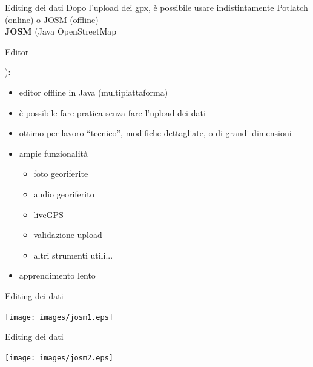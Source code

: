 \documentclass[slidestop,compress,red,notes,xcolor=dvipsnames]{beamer}	%
\begin{document}
        \begin{frame}{Editing dei dati}
            Dopo l'upload dei gpx, è possibile usare indistintamente Potlatch (online) o JOSM (offline)\pause\\
            \vspace{0.4cm}
            \textbf{JOSM} (Java OpenStreetMap \begin{footnotesize}Editor\end{footnotesize}):
            \begin{itemize}
                \item editor offline in Java (multipiattaforma)
                \pause
                \item è possibile fare pratica senza fare l'upload dei dati
                \pause
                \item ottimo per lavoro ``tecnico'', modifiche dettagliate, o di grandi dimensioni
                \pause
                \item ampie funzionalità
                \begin{itemize}
                    \item foto georiferite
                    \item audio georiferito
                    \item liveGPS
                    \item validazione upload
                    \item altri strumenti utili...
                \end{itemize}
                \pause
                \item apprendimento lento
            \end{itemize}
        \end{frame}

        \begin{frame}{Editing dei dati}
            \begin{center}
                \texttt{[image: images/josm1.eps]}
            \end{center}
        \end{frame}

        \begin{frame}{Editing dei dati}
            \begin{center}
            \texttt{[image: images/josm2.eps]}
            \end{center}
        \end{frame}
\end{document}

